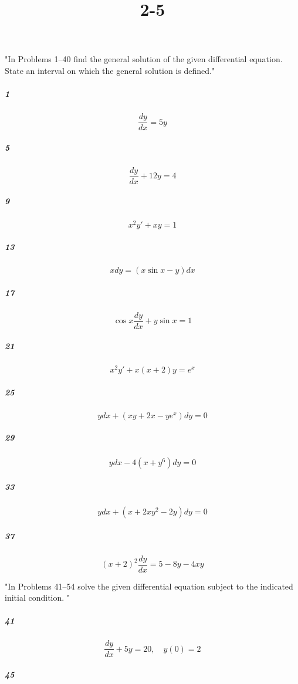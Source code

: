 \documentclass[fleqn]{article}
\title{2-5}
\begin{document}
\maketitle
\pagebreak
 "In Problems 1–40 find the general solution of the given differential equation. State an interval on which the general solution is defined."

\subparagraph{1}

\[
\frac{dy}{dx} = 5y
\]
\vfill



\subparagraph{5}

\[
\frac{dy}{dx} + 12y = 4
\]
\vfill


\pagebreak


\subparagraph{9}

\[
x^{2}y' + xy = 1
\]
\vfill



\subparagraph{13}

\[
x dy = (x \sin x - y) dx
\]
\vfill


\pagebreak


\subparagraph{17}

\[
\cos x \frac{dy}{dx} + y \sin x = 1
\]
\vfill



\subparagraph{21}

\[
x^2y' + x(x + 2)y = e^x
\]
\vfill


\pagebreak


\subparagraph{25}

\[
y dx + (xy + 2x - ye^x) dy = 0
\]
\vfill



\subparagraph{29}

\[
y dx - 4(x + y^6) dy = 0
\]
\vfill


\pagebreak


\subparagraph{33}

\[
y dx + (x + 2xy^2 - 2y) dy = 0
\]
\vfill



\subparagraph{37}

\[
(x + 2)^2 \frac{dy}{dx} = 5 - 8y - 4xy
\]
\vfill


\pagebreak
 "In Problems 41–54 solve the given differential equation subject to the indicated initial condition. "

\subparagraph{41}

\[
\frac{dy}{dx} + 5y = 20, \quad y(0) = 2
\]
\vfill



\subparagraph{45}
\end{document}
